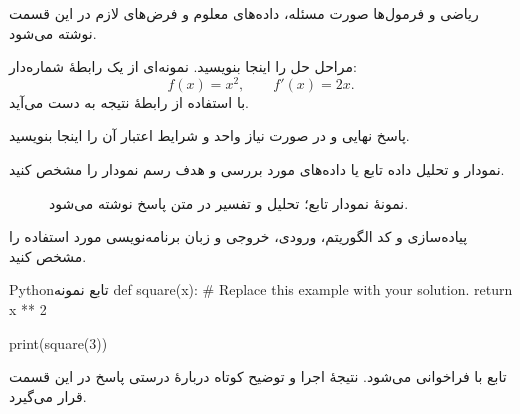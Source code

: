 \documentclass[\AssignmentBaseSize,a4paper]{article}
\begin{document}
\MakeAssignmentTitle

\begin{problem}[۲۵ نمره]{ریاضی و فرمول‌ها}
  صورت مسئله، داده‌های معلوم و فرض‌های لازم در این قسمت نوشته می‌شود.
\end{problem}
\begin{solution}
  مراحل حل را اینجا بنویسید. نمونه‌ای از یک رابطهٔ شماره‌دار:
  \begin{equation}\label{eq:starter}
    f(x)=x^2,\qquad f'(x)=2x.
  \end{equation}
  با استفاده از رابطهٔ  نتیجه به دست می‌آید.
  \begin{answerbox}
    پاسخ نهایی و در صورت نیاز واحد و شرایط اعتبار آن را اینجا بنویسید.
  \end{answerbox}
\end{solution}

\begin{problem}[۲۵ نمره]{نمودار و تحلیل داده}
  تابع یا داده‌های مورد بررسی و هدف رسم نمودار را مشخص کنید.
\end{problem}
\begin{solution}
  \begin{figure}[H]
    \begin{plotarea}
    \end{plotarea}
    \caption{نمونهٔ نمودار تابع؛ تحلیل و تفسیر در متن پاسخ نوشته می‌شود.}
    \label{fig:starter}
  \end{figure}
\end{solution}

\newpage
\begin{problem}[۲۵ نمره]{پیاده‌سازی و کد}
  الگوریتم، ورودی، خروجی و زبان برنامه‌نویسی مورد استفاده را مشخص کنید.
\end{problem}
\begin{solution}
\begin{codeblock}{Python}{تابع نمونه}
def square(x):
    # Replace this example with your solution.
    return x ** 2

print(square(3))
\end{codeblock}
  تابع  با  فراخوانی می‌شود.
  نتیجهٔ اجرا و توضیح کوتاه دربارهٔ درستی پاسخ در این قسمت قرار می‌گیرد.
\end{solution}
\end{document}
